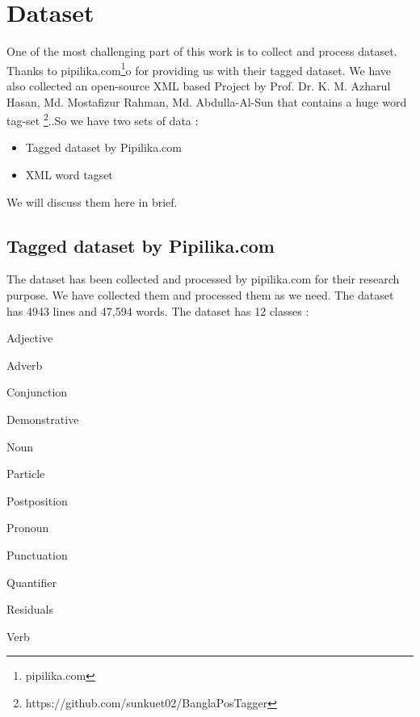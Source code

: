 \documentclass{standalone}
\begin{document}
\chapter{Dataset}
\label{dataset}

One of the most challenging part of this work is to collect and process dataset. Thanks to pipilika.com\footnote{pipilika.com}o for providing us with their tagged dataset. We have also collected an open-source XML based Project by Prof. Dr. K. M. Azharul Hasan, Md. Mostafizur Rahman, Md. Abdulla-Al-Sun that contains a huge word tag-set \footnote{https://github.com/sunkuet02/BanglaPosTagger}..So we have two sets of data :
\begin{itemize}
    \item Tagged dataset by Pipilika.com
    \item XML word tagset
\end{itemize}
We will discuss them here in brief.
\section{Tagged dataset by Pipilika.com}
The dataset has been collected and processed by pipilika.com for their research purpose. We have collected them and processed them as we need. The dataset has 4943 lines and 47,594 words. The dataset has 12 classes :
\begin{itemize}
    \begin{itemize}
    \begin{multicols}{3}
    \item Adjective
    \item Adverb
    \item Conjunction
    \item Demonstrative
    \item Noun
    \item Particle
    \item Postposition
    \item Pronoun
    \item Punctuation
    \item Quantifier
    \item Residuals
    \item Verb
    \end{multicols}
    \end{itemize} 
\end{itemize} 
\end{document}
